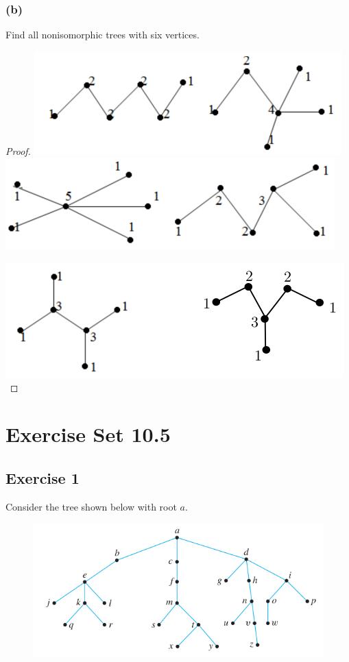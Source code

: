 \documentclass[14pt]{extarticle}
\begin{document}
\subsubsection{(b)}
Find all nonisomorphic trees with six vertices.
\begin{proof}
    \includegraphics[scale=0.5]{../images/10.4.31.b.1.png}
    \includegraphics[scale=0.5]{../images/10.4.31.b.2.png}

    \hspace{3cm}\includegraphics[scale=0.5]{../images/10.4.31.b.3.png}
\end{proof}

\section{Exercise Set 10.5}
\subsection{Exercise 1}
Consider the tree shown below with root \(a\).

\begin{figure}[ht!]
    \centering
    \includegraphics[scale=0.5]{../images/10.5.1.png}
\end{figure}
\end{document}
